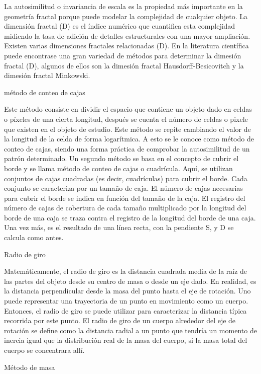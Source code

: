 \documentclass[11pt]{article}
\begin{document}
La autosimilitud o invariancia de escala es la propiedad más importante en la geometría fractal porque puede modelar la complejidad de cualquier objeto. La dimensión fractal (D) es el índice numérico que cuantifica esta complejidad midiendo la tasa de adición de detalles estructurales con una mayor ampliación. Existen varias dimensiones fractales relacionadas (D). En la literatura científica puede encontrase una gran variedad de métodos para determinar la dimesión fractal (D), algunos de ellos son la dimesión fractal Hausdorff-Besicovitch y la dimesión fractal Minkowski.



método de conteo de cajas

Este método consiste en dividir el espacio que contiene un objeto dado en celdas o píxeles de una cierta longitud, después se cuenta el número de celdas o pixele que existen en el objeto de estudio. Este método se repite cambiando el valor de la longitud de la celda de forma logarítmica. A esto se le conoce como método de conteo de cajas, siendo una forma práctica de comprobar la autosimilitud de un patrón determinado. Un segundo método se basa en el concepto de cubrir el borde y se llama método de conteo de cajas o cuadrícula. Aquí, se utilizan conjuntos de cajas cuadradas (es decir, cuadrículas) para cubrir el borde. Cada conjunto se caracteriza por un tamaño de caja. El número de cajas necesarias para cubrir el borde se indica en función del tamaño de la caja. El registro del número de cajas de cobertura de cada tamaño multiplicado por la longitud del borde de una caja se traza contra el registro de la longitud del borde de una caja. Una vez más, es el resultado de una línea recta, con la pendiente S, y D se calcula como antes.

Radio de giro

Matemáticamente, el radio de giro es la distancia cuadrada media de la raíz de las partes del objeto desde su centro de masa o desde un eje dado. En realidad, es la distancia perpendicular desde la masa del punto hasta el eje de rotación. Uno puede representar una trayectoria de un punto en movimiento como un cuerpo. Entonces, el radio de giro se puede utilizar para caracterizar la distancia típica recorrida por este punto. El radio de giro de un cuerpo alrededor del eje de rotación se define como la distancia radial a un punto que tendría un momento de inercia igual que la distribución real de la masa del cuerpo, si la masa total del cuerpo se concentrara allí.

Método de masa
\end{document}
